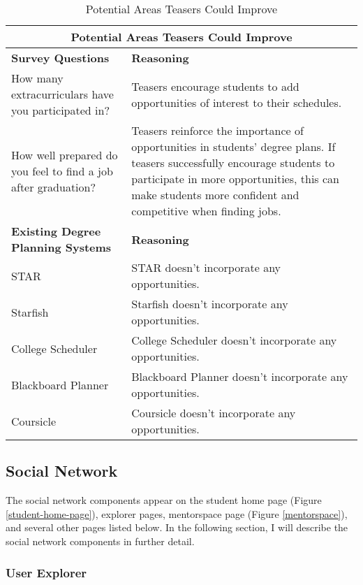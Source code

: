 \begin{table}[htbp!]
\centering
 \caption{Potential Areas Teasers Could Improve}
\begin{tabular}{  |p{4cm}|p{12cm}| } 
\hline
 \multicolumn{2}{|c|}{Potential Areas Teasers Could Improve}\\
\hline
 \textbf{Survey Questions} & \textbf{Reasoning} \\ 
  \hline
  How many extracurriculars have you participated in? & Teasers encourage students to add  opportunities of interest to their schedules.\\
  \hline
  How well prepared do you feel to find a job after graduation? & Teasers reinforce the importance of opportunities in students' degree plans.  If teasers successfully encourage students to participate in more opportunities, this can make students more confident and competitive when finding jobs.\\
    \hline
   \textbf{Existing Degree Planning Systems} & \textbf{Reasoning} \\ 
  \hline
  STAR & STAR doesn't incorporate any opportunities. \\
    \hline
  Starfish & Starfish doesn't incorporate any opportunities.\\
    \hline
  College Scheduler & College Scheduler doesn't incorporate any opportunities.\\
    \hline
  Blackboard Planner & Blackboard Planner doesn't incorporate any opportunities.\\
    \hline
  Coursicle & Coursicle doesn't incorporate any opportunities. \\
  \hline
\end{tabular}
\end{table}

\subsection{Social Network}

The social network components appear on the student home page (Figure \ref{student-home-page}), explorer pages, mentorspace page (Figure \ref{mentorspace}), and several other pages listed below. In the following section, I will describe the social network components in further detail. 

\subsubsection{User Explorer}

